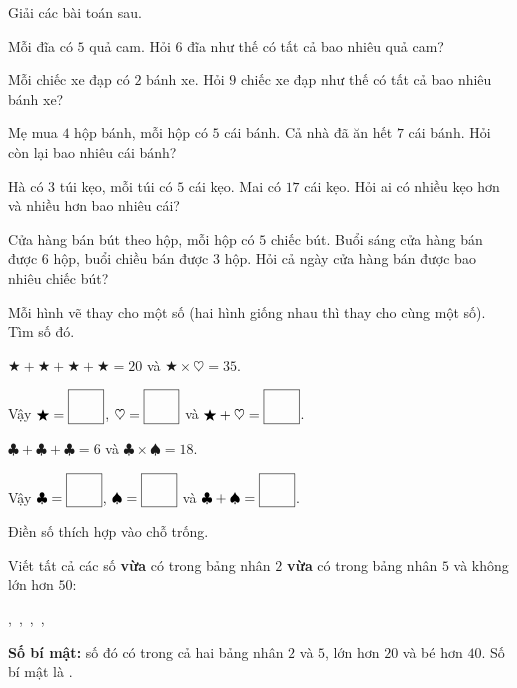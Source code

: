 \documentclass[../main.tex]{subfiles}
\begin{document}
\begin{bt}
    Giải các bài toán sau.
    \begin{listEX}
        \item Mỗi đĩa có $5$ quả cam. Hỏi $6$ đĩa như thế có tất cả bao nhiêu quả cam?
        \TTbatdauhinh
        {\centering{}\par}
        \item Mỗi chiếc xe đạp có $2$ bánh xe. Hỏi $9$ chiếc xe đạp như thế có tất cả bao nhiêu bánh xe?
    \end{listEX}
\end{bt}
\newpage
\begin{bt}
    Mẹ mua $4$ hộp bánh, mỗi hộp có $5$ cái bánh. Cả nhà đã ăn hết $7$ cái bánh. Hỏi còn lại bao nhiêu cái bánh?
\end{bt}
\begin{bt}
    Hà có $3$ túi kẹo, mỗi túi có $5$ cái kẹo. Mai có $17$ cái kẹo. Hỏi ai có nhiều kẹo hơn và nhiều hơn bao nhiêu cái?
\end{bt}

\begin{bt}
    Cửa hàng bán bút theo hộp, mỗi hộp có $5$ chiếc bút. Buổi sáng cửa hàng bán được $6$ hộp, buổi chiều bán được $3$ hộp. Hỏi cả ngày cửa hàng bán được bao nhiêu chiếc bút?
\end{bt}

\begin{bt}
    Mỗi hình vẽ thay cho một số (hai hình giống nhau thì thay cho cùng một số). Tìm số đó.
    \begin{listEX}
        \item $\bigstar+\bigstar+\bigstar+\bigstar=20$ và $\bigstar\times\heartsuit=35$.\par
        Vậy $\bigstar=\TTdien$, $\heartsuit=\TTdien$ và $\bigstar+\heartsuit=\TTdien$.
        \item $\clubsuit+\clubsuit+\clubsuit=6$ và $\clubsuit\times\spadesuit=18$.\par
        Vậy $\clubsuit=\TTdien$, $\spadesuit=\TTdien$ và $\clubsuit+\spadesuit=\TTdien$.
    \end{listEX}
\end{bt}
\newpage
\begin{bt}
    Điền số thích hợp vào chỗ trống.
    \par\nopagebreak
    \begin{listEX}
        \item Viết tất cả các số \textbf{vừa} có trong bảng nhân $2$ \textbf{vừa} có trong bảng nhân $5$ và không lớn hơn $50$:\par\vspace{4pt}
        \TTcham[1cm],\ \TTcham[1cm],\ \TTcham[1cm],\ \TTcham[1cm],\ \TTcham[1cm]
        \item \textbf{Số bí mật:} số đó có trong cả hai bảng nhân $2$ và $5$, lớn hơn $20$ và bé hơn $40$. Số bí mật là \TTcham[1.5cm].
    \end{listEX}
\end{bt}
\end{document}
